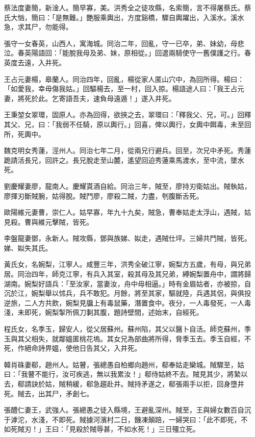 \begin{pinyinscope}
蔡法度妻簡，新淦人。簡早寡，美。洪秀全之徒攻縣，名索簡，言不得屠蔡氏。蔡氏大忷，簡曰：「是無難。」艷服乘輿出，方度谿橋，驟自輿躍出，入溪水。溪水急，求其尸，勿能得。

張守一女春英，山西人，寓海城。同治二年，回亂，守一已卒，弟、妹幼，母悲泣。春英陽語回：「能脫我母及弟、妹，原相從。」回遣兩騎使守一舊僕護之行。春英度去遠，入井死。

王占元妻楊，皋蘭人。同治四年，回亂，楊從家人匿山穴中，為回所得。楊曰：「如愛我，幸毋傷我姑。」回驅楊去，至一村，回入掠。楊語途人曰：「我王占元妻，將死於此。乞寄語吾夫，速負母遠遁！」遂入井死。

王秉堃女翠環，固原人。亦為回得，欲挾之去，翠環曰：「釋我父、兄，可。」回釋其父、兄，曰：「我弱不任騎，原以輿行。」回喜，俾以輿行，女輿中餌毒，未至回所，死輿中。

魏克明女秀蓮，涇州人。同治七年二月，從兩兄行避兵。回至，次兄中矛死。秀蓮跪請活長兄，回許之。長兄脫走至山麓，遙望回迫秀蓮乘馬渡水，至中流，墜水死。

劉慶耀妻廖，龍南人。慶耀貰酒自給。同治三年，賊至，廖持刃衛姑出。賊執姑，廖揮刃斷賊腕，姑得脫。賊鬥廖，廖殺二賊，力盡，刳腹斷舌死。

歐陽維元妻曹，崇仁人。姑早寡，年九十九矣，賊急，曹奉姑走太浮山，遇賊，姑見殺。曹與維元擊賊，皆死。

李盤龍妻鄧，永新人。賊攻縣，鄧與族娣、姒走，遇賊仕坪。三婦共鬥賊，皆死。娣、姒失其氏。

黃氏女，名婉梨，江寧人。咸豐三年，洪秀全破江寧，婉梨方五歲，有母，與兄弟居。同治四年，師克江寧，有兵入其室，殺其母及其兄弟，縛婉梨置舟中，謂將歸湖南。婉梨好語兵：「至汝家，當妻汝，舟中毋相逼。」時有金眉姑者，亦被掠，自沉於江，婉梨舉以怵兵，兵不敢犯。月餘，將至其家，驅就陸，兵遇其侶，與俱投逆旅，二人方共飲，婉梨見牖上有毒鼠藥，潛置食中。夜分，一人毒發死，一人毒淺，未即死，婉梨掣所佩刀剚其腹，題詩壁間，述始末，自經死。

程氏女，名季玉，歸安人，從父居蘇州。蘇州陷，其父以醫卜自活。師克蘇州，季玉與其父相失，就鄰媼匿桃花塢。其女兄為部曲將所得，脅季玉去。季玉自經，不死，作絕命詩畀媼，使他日告其父，入井死。

韓肖硃妻郗，趙州人。姑瞽，張總愚自柏鄉向趙州，郗奉姑走欒城。賊驟至，姑曰：「我瞽不能行，汝可疾逃，無以我累汝！」郗侍姑終不去。賊見其少，將縶以去，郗請訣於姑，賊稍緩，郗急趨赴井。賊持矛遂之，郗張兩手以拒，回身墮井死。賊去，出其尸，矛創七。

張醴仁妻王，武強人。張總愚之徒入縣境，王避亂深州。賊至，王與婦女數百自沉于滹沱，水淺，不即死。賊據河濱村二日，饑凍顛踣，一婦哭曰：「此不即死，不如死賊刃！」王曰：「見殺於賊辱甚，不如水死！」三日殭立死。


\end{pinyinscope}
